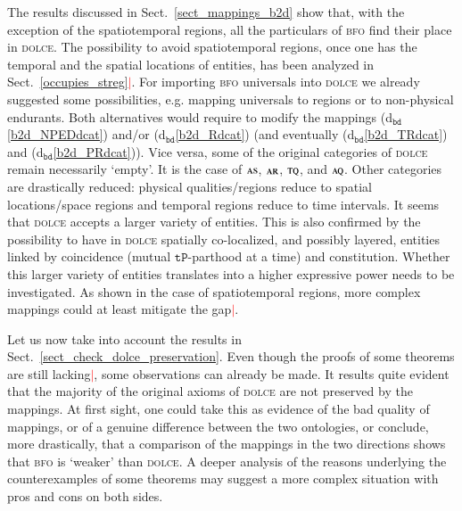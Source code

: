 \documentclass[ao]{iosart2x}
\newcommand{\nb}[1]{\textcolor{red}{$|$}\marginpar{\hspace*{-0cm}\parbox{20mm}{\scriptsize\raggedright\textcolor{red}{#1}}}}
\newcommand{\bdDefLabel}{\textrm{d$_\texttt{bd}$}}
\newcommand{\refbddf}[1]{({\bdDefLabel}\ref{#1})}
\newcommand{\pr}[1]{\mathtt{#1}}
\newcommand{\dolce}{{\textsc{dolce}}}
\newcommand{\bfo}{{\textsc{bfo}}}
\newcommand {\AQdcat} {\textsc{aq}}
\newcommand {\ARdcat} {\textsc{ar}}
\newcommand {\ASdcat} {\textsc{as}}
\newcommand {\TQdcat} {\textsc{tq}}
\newcommand {\TPd} {\ensuremath{\pr{tP}}}
\begin{document}
The results discussed in Sect.~\ref{sect_mappings_b2d} show that, with the exception of the spatiotemporal regions, all the particulars of {\bfo} find their place in {\dolce}. The possibility to avoid spatiotemporal regions, once one has the temporal and the spatial locations of entities, has been analyzed in Sect.~\ref{occupies_streg}\nb{FC: ricordarsi di attuare o eliminare}. For importing {\bfo} universals into {\dolce} we already suggested some possibilities, e.g. mapping universals to regions or to non-physical endurants. Both alternatives would require to modify the mappings \refbddf{b2d_NPEDdcat} and/or  \refbddf{b2d_Rdcat} (and eventually \refbddf{b2d_TRdcat} and \refbddf{b2d_PRdcat}). Vice versa, some of the original categories of {\dolce} remain necessarily `empty'. It is the case of $\ASdcat$, $\ARdcat$, $\TQdcat$, and $\AQdcat$. Other categories are drastically reduced: physical qualities/regions reduce to spatial locations/space regions and temporal regions reduce to time intervals. It seems that {\dolce} accepts a larger variety of entities. This is also confirmed by the possibility to have in {\dolce} spatially co-localized, and possibly layered, entities linked by coincidence (mutual $\TPd$-parthood at a time) and constitution. Whether this larger variety of entities translates into a higher expressive power needs to be investigated. As shown in the case of spatiotemporal regions, more complex mappings could at least mitigate the gap\nb{FC: idem qui}.

Let us now take into account the results in Sect.~\ref{sect_check_dolce_preservation}. Even though the proofs of some theorems are still lacking\nb{FC: questo paragrafo dipendono dalla futura struttura del paper}, some observations can already be made. It results quite evident that the majority of the original axioms of {\dolce} are not preserved by the mappings. At first sight, one could take this as evidence of the bad quality of mappings, or of a genuine difference between the two ontologies, or conclude, more drastically, that a comparison of the mappings in the two directions shows that {\bfo} is `weaker' than {\dolce}. A deeper analysis of the reasons underlying the counterexamples of some theorems may suggest a more complex situation with pros and cons on both sides.  
\end{document}
